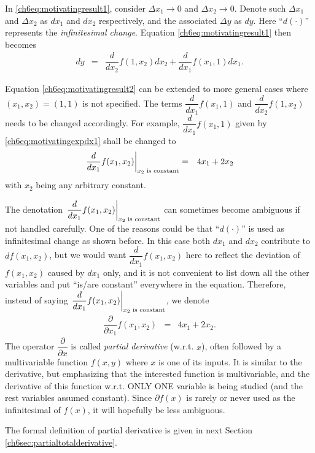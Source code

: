 In \eqref{ch6eq:motivatingresult1}, consider $\Delta x_1 \rightarrow 0$ and $\Delta x_2 \rightarrow 0$. Denote such $\Delta x_1$ and $\Delta x_2$ as $dx_1$ and $dx_2$ respectively, and the associated $\Delta y$ as $dy$. Here ``$d(\cdot)$'' represents the \textit{infinitesimal change}. Equation \eqref{ch6eq:motivatingresult1} then becomes
\begin{eqnarray}
	d y &=& \dfrac{d}{dx_2}f(1,x_2) d x_2 + \dfrac{d}{dx_1}f(x_1,1) d x_1. \label{ch6eq:motivatingresult2}
\end{eqnarray}

Equation \eqref{ch6eq:motivatingresult2} can be extended to more general cases where $(x_1, x_2) = (1, 1)$ is not specified. The terms $\dfrac{d}{dx_1}f(x_1,1)$ and $\dfrac{d}{dx_2}f(1,x_2)$ needs to be changed accordingly. For example, $\dfrac{d}{dx_1}f(x_1,1)$ given by \eqref{ch6eq:motivatingexpdx1} shall be changed to
\begin{eqnarray}
	\left.\dfrac{d}{dx_1}f(x_1,x_2)\right|_{x_2 \textup{~is constant}} &=& 4x_1 + 2x_2 \nonumber
\end{eqnarray}
with $x_2$ being any arbitrary constant.

The denotation $\left.\dfrac{d}{dx_1}f(x_1,x_2)\right|_{x_2 \textup{~is constant}}$ can sometimes become ambiguous if not handled carefully. One of the reasons could be that ``$d(\cdot)$'' is used as infinitesimal change as shown before. In this case both $dx_1$ and $dx_2$ contribute to $df(x_1,x_2)$, but we would want $\dfrac{d}{dx_1}f(x_1,x_2)$ here to reflect the deviation of $f(x_1,x_2)$ caused by $dx_1$ only, and it is not convenient to list down all the other variables and put ``is/are constant'' everywhere in the equation. Therefore, instead of saying $\left.\dfrac{d}{dx_1}f(x_1,x_2)\right|_{x_2 \textup{~is constant}}$, we denote
\begin{eqnarray}
	\dfrac{\partial}{\partial x_1} f(x_1, x_2) &=& 4x_1 + 2x_2. \nonumber
\end{eqnarray}
The operator $\dfrac{\partial}{\partial x}$ is called \textit{partial derivative} (w.r.t. $x$), often followed by a multivariable function $f(x,y)$ where $x$ is one of its inputs. It is similar to the derivative, but emphasizing that the interested function is multivariable, and the derivative of this function w.r.t. ONLY ONE variable is being studied (and the rest variables assumed constant). Since $\partial f(x)$ is rarely or never used as the infinitesimal of $f(x)$, it will hopefully be less ambiguous.

The formal definition of partial derivative is given in next Section \ref{ch6sec:partialtotalderivative}.

